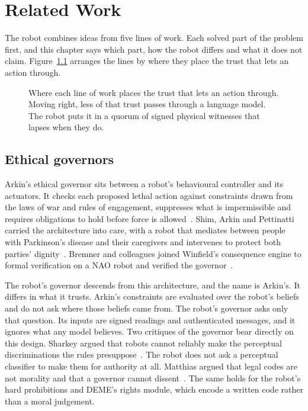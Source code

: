 \chapter{Related Work}
\label{ch:related}

The robot combines ideas from five lines of work. Each solved part of the problem first, and this
chapter says which part, how the robot differs and what it does not claim. Figure~\ref{fig:trust}
arranges the lines by where they place the trust that lets an action through.

\begin{figure}[t]
\centering
\resizebox{\textwidth}{!}{}
\caption{Where each line of work places the trust that lets an action through. Moving right, less
of that trust passes through a language model. The robot puts it in a quorum of signed physical
witnesses that lapses when they do.}
\label{fig:trust}
\end{figure}

\section{Ethical governors}

Arkin's ethical governor sits between a robot's behavioural controller and its actuators. It checks
each proposed lethal action against constraints drawn from the laws of war and rules of
engagement, suppresses what is impermissible and requires obligations to hold before force is
allowed~\cite{arkin2008governing,arkin2009governing,arkin2009ethicalgovernor,arkin2012moral}.
Shim, Arkin and Pettinatti carried the architecture into care, with a robot that mediates between
people with Parkinson's disease and their caregivers and intervenes to protect both parties'
dignity~\cite{shim2017intervening}. Bremner and colleagues joined Winfield's consequence engine to
formal verification on a NAO robot and verified the governor~\cite{bremner2019proactive}.

The robot's governor descends from this architecture, and the name is Arkin's. It differs in what
it trusts. Arkin's constraints are evaluated over the robot's beliefs and do not ask where those
beliefs came from. The robot's governor asks only that question. Its inputs are signed readings and
authenticated messages, and it ignores what any model believes. Two critiques of the governor bear
directly on this design. Sharkey argued that robots cannot reliably make the perceptual
discriminations the rules presuppose~\cite{sharkey2010sayingno}. The robot does not ask a
perceptual classifier to make them for authority at all. Matthias argued that legal codes are not
morality and that a governor cannot dissent~\cite{matthias2011governor}. The same holds for the
robot's hard prohibitions and DEME's rights module, which encode a written code rather than a moral
judgement.

